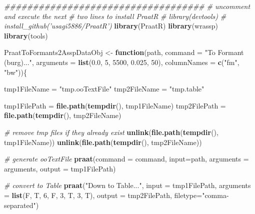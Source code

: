 \documentclass[]{book}
\newenvironment{Shaded}{\begin{snugshade}}{\end{snugshade}}
\newcommand{\CommentTok}[1]{\textcolor[rgb]{0.56,0.35,0.01}{\textit{#1}}}
\newcommand{\ControlFlowTok}[1]{\textcolor[rgb]{0.13,0.29,0.53}{\textbf{#1}}}
\newcommand{\DataTypeTok}[1]{\textcolor[rgb]{0.13,0.29,0.53}{#1}}
\newcommand{\DecValTok}[1]{\textcolor[rgb]{0.00,0.00,0.81}{#1}}
\newcommand{\FloatTok}[1]{\textcolor[rgb]{0.00,0.00,0.81}{#1}}
\newcommand{\KeywordTok}[1]{\textcolor[rgb]{0.13,0.29,0.53}{\textbf{#1}}}
\newcommand{\NormalTok}[1]{#1}
\newcommand{\StringTok}[1]{\textcolor[rgb]{0.31,0.60,0.02}{#1}}
\begin{document}
\begin{Shaded}
\begin{Highlighting}[]
\CommentTok{###################################}
\CommentTok{# uncomment and execute the next }
\CommentTok{# two lines to install PraatR}
\CommentTok{# library(devtools)}
\CommentTok{# install_github('usagi5886/PraatR')}
\KeywordTok{library}\NormalTok{(PraatR)}
\KeywordTok{library}\NormalTok{(wrassp)}
\KeywordTok{library}\NormalTok{(tools)}

\NormalTok{PraatToFormants2AsspDataObj <-}\StringTok{ }\ControlFlowTok{function}\NormalTok{(path,}
                                        \DataTypeTok{command =} 
                                          \StringTok{"To Formant (burg)..."}\NormalTok{,}
                                        \DataTypeTok{arguments =} \KeywordTok{list}\NormalTok{(}\FloatTok{0.0}\NormalTok{, }
                                                         \DecValTok{5}\NormalTok{, }\DecValTok{5500}\NormalTok{, }
                                                         \FloatTok{0.025}\NormalTok{, }\DecValTok{50}\NormalTok{), }
                                        \DataTypeTok{columnNames =} \KeywordTok{c}\NormalTok{(}\StringTok{"fm"}\NormalTok{, }\StringTok{"bw"}\NormalTok{))\{}

\NormalTok{  tmp1FileName =}\StringTok{ "tmp.ooTextFile"}
\NormalTok{  tmp2FileName =}\StringTok{ "tmp.table"}
  
\NormalTok{  tmp1FilePath =}\StringTok{ }\KeywordTok{file.path}\NormalTok{(}\KeywordTok{tempdir}\NormalTok{(), tmp1FileName)}
\NormalTok{  tmp2FilePath =}\StringTok{ }\KeywordTok{file.path}\NormalTok{(}\KeywordTok{tempdir}\NormalTok{(), tmp2FileName)}
  
  \CommentTok{# remove tmp files if they already exist}
  \KeywordTok{unlink}\NormalTok{(}\KeywordTok{file.path}\NormalTok{(}\KeywordTok{tempdir}\NormalTok{(), tmp1FileName))}
  \KeywordTok{unlink}\NormalTok{(}\KeywordTok{file.path}\NormalTok{(}\KeywordTok{tempdir}\NormalTok{(), tmp2FileName))}
  
  \CommentTok{# generate ooTextFile}
  \KeywordTok{praat}\NormalTok{(}\DataTypeTok{command =}\NormalTok{ command, }
        \DataTypeTok{input=}\NormalTok{path, }
        \DataTypeTok{arguments =}\NormalTok{ arguments, }
        \DataTypeTok{output =}\NormalTok{ tmp1FilePath)}
  
  \CommentTok{# convert to Table}
  \KeywordTok{praat}\NormalTok{(}\StringTok{"Down to Table..."}\NormalTok{,}
        \DataTypeTok{input =}\NormalTok{ tmp1FilePath,}
        \DataTypeTok{arguments =} \KeywordTok{list}\NormalTok{(F, T, }\DecValTok{6}\NormalTok{, F, }\DecValTok{3}\NormalTok{, T, }\DecValTok{3}\NormalTok{, T), }
        \DataTypeTok{output =}\NormalTok{ tmp2FilePath,}
        \DataTypeTok{filetype=}\StringTok{"comma-separated"}\NormalTok{)}
  

\end{Highlighting}
\end{Shaded}
\end{document}
